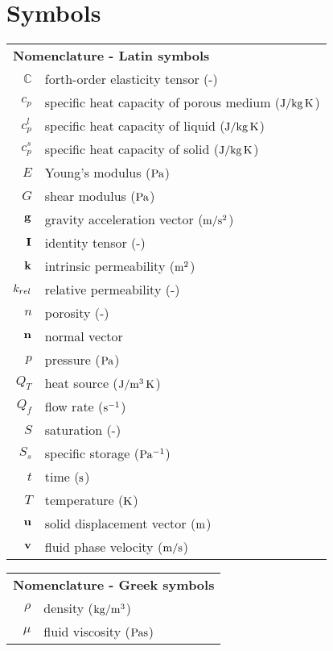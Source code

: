 \chapter{Symbols}
\label{sec:symbols}

\begin{table}[h!b!p!]
\begin{tabular}{|rl|}
\hline
\multicolumn{2}{|l|}{\bf Nomenclature - Latin symbols} \\
${\mathbb C}$ & forth-order elasticity tensor (-)\\
$c_p$ & specific heat capacity of porous medium (${\rm J/kg\,K}$)\\
$c_p^l$ & specific heat capacity of liquid (${\rm J/kg\,K}$)\\
$c_p^s$ & specific heat capacity of solid ($\rm J/kg\,K$)\\
$E$ & Young's modulus ($\rm Pa$)\\
$G$ & shear modulus ($\rm Pa$)\\
${\bf g}$ & gravity acceleration vector ($\rm m/s^2$)\\
${\bf I}$ & identity tensor (-)\\
${\bf k}$ & intrinsic permeability ($\rm m^2$)\\
$k_{rel}$  & relative permeability (-)\\
$n$ & porosity (-)\\
${\bf n}$ & normal vector\\
$p$ & pressure ($\rm Pa$)\\
$Q_T$ & heat source ($\rm J/m^3\,K$)\\
$Q_f$ & flow rate ($\rm s^{-1}$)\\
$S$   & saturation (-)\\
$S_s$ & specific storage ($\rm Pa^{-1}$)\\
$t$ & time ($\rm s$)\\
$T$ & temperature ($\rm K$)\\
${\bf u}$ & solid displacement vector ($\rm m$)\\
${\bf v}$ & fluid phase velocity ($\rm m/s$)\\
\hline
\end{tabular}
\end{table}

\begin{table}[h!b!p!]
\begin{tabular}{|rl|}
\hline
\multicolumn{2}{|l|}{\bf Nomenclature - Greek symbols} \\
$\rho$ & density (${\rm kg/m^3}$)\\
$\mu$  & fluid viscosity (${\rm Pa s}$)\\
\hline
\end{tabular}
\end{table}
